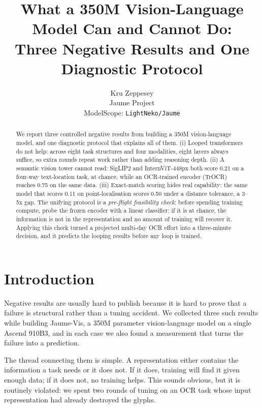 \documentclass[10pt,twocolumn,letterpaper]{article}
\title{\vspace{-1.2em}What a 350M Vision-Language Model Can and Cannot Do:\\Three Negative Results and One Diagnostic Protocol}
\author{Kru Zeppesey\\\small Jaume Project\\\small ModelScope: \texttt{LightNeko/Jaume}}
\date{}
\begin{document}
\maketitle

\begin{abstract}
We report three controlled negative results from building a 350M
vision-language model, and one diagnostic protocol that explains all of them.
(i) Looped transformers do not help: across eight task structures and four
modalities, eight layers always suffice, so extra rounds repeat work rather
than adding reasoning depth. (ii) A semantic vision tower cannot read:
SigLIP2 and InternViT-448px both score 0.21 on a four-way text-location task,
at chance, while an OCR-trained encoder (TrOCR) reaches 0.75 on the same
data. (iii) Exact-match scoring hides real capability: the same model that
scores 0.11 on point-localisation scores 0.50 under a distance tolerance, a
3--5x gap. The unifying protocol is a \emph{pre-flight feasibility check}:
before spending training compute, probe the frozen encoder with a linear
classifier; if it is at chance, the information is not in the representation
and no amount of training will recover it. Applying this check turned a
projected multi-day OCR effort into a three-minute decision, and it predicts
the looping results before any loop is trained.
\end{abstract}

\section{Introduction}

Negative results are usually hard to publish because it is hard to prove that
a failure is structural rather than a tuning accident. We collected three
such results while building Jaume-Vis, a 350M parameter vision-language model
on a single Ascend 910B3, and in each case we also found a measurement that
turns the failure into a prediction.

The thread connecting them is simple. A representation either contains the
information a task needs or it does not. If it does, training will find it
given enough data; if it does not, no training helps. This sounds obvious, but
it is routinely violated: we spent two rounds of tuning on an OCR task whose
input representation had already destroyed the glyphs.
\end{document}
